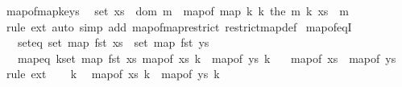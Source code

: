 \begin{isabellebody}
\isanewline
%
\endisadelimproof
\isanewline
{}\isamarkupfalse%
\ map{\isacharunderscore}{\kern0pt}of{\isacharunderscore}{\kern0pt}map{\isacharunderscore}{\kern0pt}keys{\isacharcolon}{\kern0pt}\isanewline
\ \ {\isachardoublequoteopen}set\ xs\ {\isacharequal}{\kern0pt}\ dom\ m\ {\isasymLongrightarrow}\ map{\isacharunderscore}{\kern0pt}of\ {\isacharparenleft}{\kern0pt}map\ {\isacharparenleft}{\kern0pt}{\isasymlambda}k{\isachardot}{\kern0pt}\ {\isacharparenleft}{\kern0pt}k{\isacharcomma}{\kern0pt}\ the\ {\isacharparenleft}{\kern0pt}m\ k{\isacharparenright}{\kern0pt}{\isacharparenright}{\kern0pt}{\isacharparenright}{\kern0pt}\ xs{\isacharparenright}{\kern0pt}\ {\isacharequal}{\kern0pt}\ m{\isachardoublequoteclose}\isanewline
%
\isadelimproof
\ \ %
\endisadelimproof
%
\isatagproof
{}\isamarkupfalse%
\ {\isacharparenleft}{\kern0pt}rule\ ext{\isacharparenright}{\kern0pt}\ {\isacharparenleft}{\kern0pt}auto\ simp\ add{\isacharcolon}{\kern0pt}\ map{\isacharunderscore}{\kern0pt}of{\isacharunderscore}{\kern0pt}map{\isacharunderscore}{\kern0pt}restrict\ restrict{\isacharunderscore}{\kern0pt}map{\isacharunderscore}{\kern0pt}def{\isacharparenright}{\kern0pt}%
\endisatagproof
{\isafoldproof}%
%
\isadelimproof
\isanewline
%
\endisadelimproof
\isanewline
{}\isamarkupfalse%
\ map{\isacharunderscore}{\kern0pt}of{\isacharunderscore}{\kern0pt}eqI{\isacharcolon}{\kern0pt}\isanewline
\ \ \ set{\isacharunderscore}{\kern0pt}eq{\isacharcolon}{\kern0pt}\ {\isachardoublequoteopen}set\ {\isacharparenleft}{\kern0pt}map\ fst\ xs{\isacharparenright}{\kern0pt}\ {\isacharequal}{\kern0pt}\ set\ {\isacharparenleft}{\kern0pt}map\ fst\ ys{\isacharparenright}{\kern0pt}{\isachardoublequoteclose}\isanewline
\ \ \ map{\isacharunderscore}{\kern0pt}eq{\isacharcolon}{\kern0pt}\ {\isachardoublequoteopen}{\isasymforall}k{\isasymin}set\ {\isacharparenleft}{\kern0pt}map\ fst\ xs{\isacharparenright}{\kern0pt}{\isachardot}{\kern0pt}\ map{\isacharunderscore}{\kern0pt}of\ xs\ k\ {\isacharequal}{\kern0pt}\ map{\isacharunderscore}{\kern0pt}of\ ys\ k{\isachardoublequoteclose}\isanewline
\ \ \ {\isachardoublequoteopen}map{\isacharunderscore}{\kern0pt}of\ xs\ {\isacharequal}{\kern0pt}\ map{\isacharunderscore}{\kern0pt}of\ ys{\isachardoublequoteclose}\isanewline
%
\isadelimproof
%
\endisadelimproof
%
\isatagproof
{}\isamarkupfalse%
\ {\isacharparenleft}{\kern0pt}rule\ ext{\isacharparenright}{\kern0pt}\isanewline
\ \ \isamarkupfalse%
\ k\ \isamarkupfalse%
\ {\isachardoublequoteopen}map{\isacharunderscore}{\kern0pt}of\ xs\ k\ {\isacharequal}{\kern0pt}\ map{\isacharunderscore}{\kern0pt}of\ ys\ k{\isachardoublequoteclose}\isanewline

\end{isabellebody}
